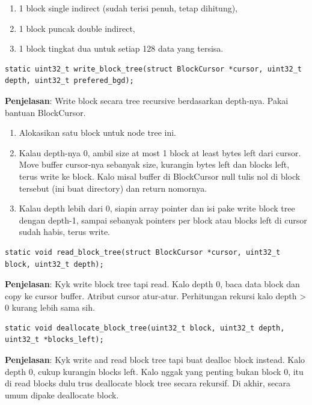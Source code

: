 \begin{enumerate}
    \item 1 block single indirect (sudah terisi penuh, tetap dihitung),
    \item 1 block puncak double indirect,
    \item 1 block tingkat dua untuk setiap 128 data yang tersisa.
\end{enumerate}

\begin{lstlisting}
static uint32_t write_block_tree(struct BlockCursor *cursor, uint32_t depth, uint32_t prefered_bgd);
\end{lstlisting}

\textbf{Penjelasan}: Write block secara tree recursive berdasarkan depth-nya. Pakai bantuan BlockCursor.
\begin{enumerate}
    \item Alokasikan satu block untuk node tree ini. 
    \item Kalau depth-nya 0, ambil size at most 1 block at least bytes left dari cursor. Move buffer cursor-nya sebanyak size, kurangin bytes left dan blocks left, terus write ke block. Kalo misal buffer di BlockCursor null tulis nol di block tersebut (ini buat directory) dan return nomornya.
    \item Kalau depth lebih dari 0, siapin array pointer dan isi pake write block tree dengan depth-1, sampai sebanyak pointers per block atau blocks left di cursor sudah habis, terus write.
\end{enumerate}

\begin{lstlisting}
static void read_block_tree(struct BlockCursor *cursor, uint32_t block, uint32_t depth);
\end{lstlisting}

\textbf{Penjelasan}: Kyk write block tree tapi read. Kalo depth 0, baca data block dan copy ke cursor buffer. Atribut cursor atur-atur. Perhitungan rekursi kalo depth > 0 kurang lebih sama sih.

\begin{lstlisting}
static void deallocate_block_tree(uint32_t block, uint32_t depth, uint32_t *blocks_left);
\end{lstlisting}

\textbf{Penjelasan}: Kyk write and read block tree tapi buat dealloc block instead. Kalo depth 0, cukup kurangin blocks left. Kalo nggak yang penting bukan block 0, itu di read blocks dulu trus deallocate block tree secara rekursif. Di akhir, secara umum dipake deallocate block.

